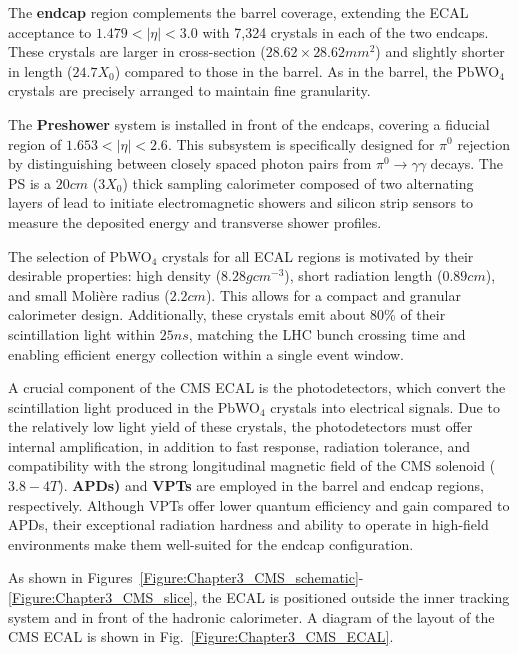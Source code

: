 The \textbf{endcap} region complements the barrel coverage, extending the ECAL acceptance to $1.479 < |\eta| < 3.0$ with 7,324 crystals in each of the two endcaps. These crystals are larger in cross-section ($28.62 \times 28.62\unit{mm}^2$) and slightly shorter in length ($24.7 X_0$) compared to those in the barrel. As in the barrel, the PbWO$_4$ crystals are precisely arranged to maintain fine granularity.

The \textbf{Preshower} system is installed in front of the endcaps, covering a fiducial region of $1.653 < |\eta| < 2.6$. This subsystem is specifically designed for $\pi^0$ rejection by distinguishing between closely spaced photon pairs from $\pi^0 \to \gamma \gamma$ decays. The PS is a $20\unit{cm}$ ($3X_0$) thick sampling calorimeter composed of two alternating layers of lead to initiate electromagnetic showers and silicon strip sensors to measure the deposited energy and transverse shower profiles.

The selection of PbWO$_4$ crystals for all ECAL regions is motivated by their desirable properties: high density ($8.28\unit{gcm}^{-3}$), short radiation length ($0.89\unit{cm}$), and small Moli\`ere radius ($2.2\unit{cm}$). This allows for a compact and granular calorimeter design. Additionally, these crystals emit about 80\% of their scintillation light within $25\unit{ns}$, matching the LHC bunch crossing time and enabling efficient energy collection within a single event window.

A crucial component of the CMS ECAL is the photodetectors, which convert the scintillation light produced in the PbWO$_4$ crystals into electrical signals. Due to the relatively low light yield of these crystals, the photodetectors must offer internal amplification, in addition to fast response, radiation tolerance, and compatibility with the strong longitudinal magnetic field of the CMS solenoid ($3.8-4\unit{T}$). \textbf{\ac{APDs})} and \textbf{\ac{VPTs}} are employed in the barrel and endcap regions, respectively. Although VPTs offer lower quantum efficiency and gain compared to APDs, their exceptional radiation hardness and ability to operate in high-field environments make them well-suited for the endcap configuration.

As shown in Figures~\ref{Figure:Chapter3_CMS_schematic}-\ref{Figure:Chapter3_CMS_slice}, the ECAL is positioned outside the inner tracking system and in front of the hadronic calorimeter. A diagram of the layout of the CMS ECAL is shown in Fig.~\ref{Figure:Chapter3_CMS_ECAL}.

